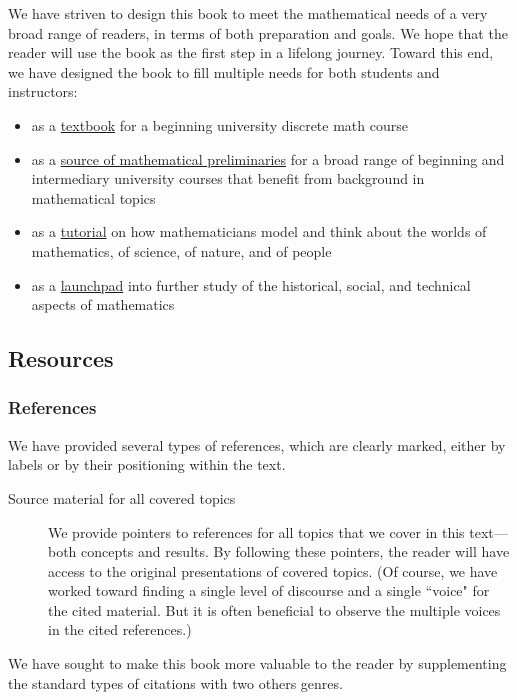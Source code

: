 We have striven to design this book to meet the mathematical needs of a very broad range of readers, in terms of both preparation and goals.   We hope that the reader will use the book as the first step in a lifelong journey.  Toward this end, we have designed the book to fill multiple needs for both students and instructors:
  \begin{itemize}
  \item
as a \underline{textbook} for a beginning university discrete math course

  \item
as a \underline{source of mathematical preliminaries} for a broad range of beginning and intermediary university courses that benefit from background in mathematical topics

  \item
as a \underline{tutorial} on how mathematicians model and think about the worlds of mathematics, of science, of nature, and of people

  \item
as a \underline{launchpad} into further study of the historical, social, and technical aspects of mathematics
  \end{itemize}

\subsection{Resources}

\subsubsection{References}

We have provided several types of references, which are clearly marked, either by labels or by their positioning within the text.  
\begin{description}
\item[{\sc Source material for all covered topics}]
We provide pointers to references for all topics that we cover in this text---both concepts and results.  By following these pointers, the reader will have access to the original presentations of covered topics.  (Of course, we have worked toward finding a single level of discourse and a single ``voice" for the cited material.  But it is often beneficial to observe the multiple voices in the cited references.)
\end{description}

\noindent
We have sought to make this book more valuable to the reader by supplementing the standard types of citations with two others genres.

